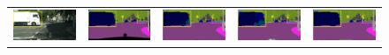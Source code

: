 \documentclass[letterpaper]{article} %
\begin{document}
\begin{figure}[!t]
\begin{tabular}{ccccc}
  \includegraphics[width=0.19\linewidth]{image/figure6/2a.png}\label{2a} &
  \hspace{-12pt}
  \includegraphics[width=0.19\linewidth]{image/figure6/2b.png}\label{2b} &
  \hspace{-12pt}
  \includegraphics[width=0.19\linewidth]{image/figure6/2c.png}\label{2c} &
  \hspace{-12pt}
  \includegraphics[width=0.19\linewidth]{image/figure6/2d.png}\label{2d} &
  \hspace{-12pt}
  \includegraphics[width=0.19\linewidth]{image/figure6/2e}\label{2e} \\


\end{tabular}
\end{figure}
\end{document}
